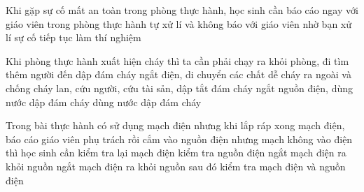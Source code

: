 \begin{ex}
	Khi gặp sự cố mất an toàn trong phòng thực hành, học sinh cần
	\choice
	{\True báo cáo ngay với giáo viên trong phòng thực hành}
	{tự xử lí và không báo với giáo viên}
	{nhờ bạn xử lí sự cố}
	{tiếp tục làm thí nghiệm}
	\loigiai{}
\end{ex}

\begin{ex}
	Khi phòng thực hành xuất hiện cháy thì ta cần phải
	\choice
	{chạy ra khỏi phòng, đi tìm thêm người đến dập đám cháy}
	{\True ngắt điện, di chuyển các chất dễ cháy ra ngoài và chống cháy lan, cứu người, cứu tài sản, dập tắt đám cháy}
	{ngắt nguồn điện, dùng nước dập đám cháy}
	{dùng nước dập đám cháy}
	\loigiai{}
\end{ex}

\begin{ex}
	Trong bài thực hành có sử dụng mạch điện nhưng khi lắp ráp xong mạch điện, báo cáo giáo viên phụ trách rồi cắm vào nguồn điện nhưng mạch không vào điện thì học sinh cần
	\choice
	{kiểm tra lại mạch điện}
	{kiểm tra nguồn điện}
	{ngắt mạch điện ra khỏi nguồn}
	{\True ngắt mạch điện ra khỏi nguồn sau đó kiểm tra mạch điện và nguồn điện}
	\loigiai{}
\end{ex}

